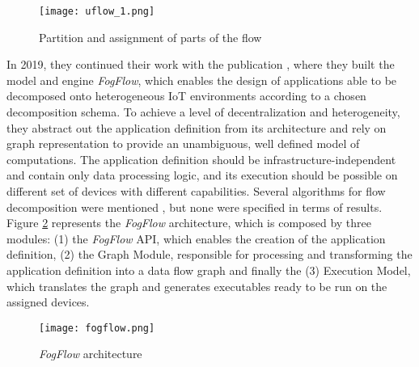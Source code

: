 \begin{figure}[h]
\caption{Partition and assignment of parts of the flow \cite{flow_based_programming_fog}}
\label{fig:uflow_1}
\centering
\texttt{[image: uflow\_1.png]}
\end{figure}

\par In 2019, they continued their work with the publication \cite{fog_flow}, where they built the model and engine \textit{FogFlow}, which enables the design of applications able to be decomposed onto heterogeneous IoT environments according to a chosen decomposition schema. To achieve a level of decentralization and heterogeneity, they abstract out the application definition from its architecture and rely on graph representation to provide an unambiguous, well defined model of computations. The application definition should be infrastructure-independent and contain only data processing logic, and its execution should be possible on different set of devices with different capabilities. Several algorithms for flow decomposition were mentioned \cite{algorithm_fog} \cite{ifogsim}, but none were specified in terms of results. Figure \ref{fig:fogflow} represents the \textit{FogFlow} architecture, which is composed by three modules: (1) the \textit{FogFlow} API, which enables the creation of the application definition, (2) the Graph Module, responsible for processing and transforming the application definition into a data flow graph and finally the (3) Execution Model, which translates the graph and generates executables ready to be run on the assigned devices.

\begin{figure}[h]
\caption{\textit{FogFlow} architecture \cite{fog_flow}}
\label{fig:fogflow}
\centering
\texttt{[image: fogflow.png]}
\end{figure}

